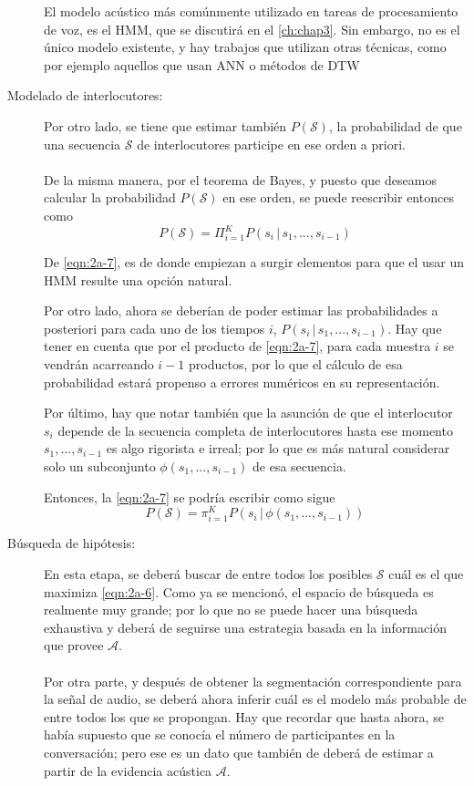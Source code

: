 \begin{description}
El modelo acústico más comúnmente utilizado en tareas de procesamiento de voz, es el \acf{HMM}, que se discutirá en el \autoref{ch:chap3}. Sin embargo, no es el único modelo existente, y hay trabajos que utilizan otras técnicas, como por ejemplo aquellos que usan \ac{ANN} \cite{Jothilakshmi2009} \cite{Gutzwiller2010}  o métodos de \ac{DTW} \cite{Huijbregts2011} 
 
\item[Modelado de interlocutores:]
Por otro lado, se tiene que estimar también $P(\mathcal{S})$, la probabilidad de que una secuencia $\mathcal{S}$ de interlocutores participe en ese orden a priori. 
\\~\\
De la misma manera, por el teorema de Bayes, y puesto que deseamos calcular la probabilidad $P(\mathcal{S})$ en ese orden, se puede reescribir entonces como
\begin{equation}
P(\mathcal{S}) = \Pi_{i=1}^K P(s_i \,|\, s_1, ..., s_{i-1})
\label{eqn:2a-7}
\end{equation}

De \eqref{eqn:2a-7}, es de donde empiezan a surgir elementos para que el usar un \ac{HMM} resulte una opción natural.

Por otro lado, ahora se deberían de poder estimar las probabilidades a posteriori para cada uno de los tiempos $i$, $P(s_i \,|\, s_1, ..., s_{i-1})$. Hay que tener en cuenta que por el producto de \eqref{eqn:2a-7}, para cada muestra $i$ se vendrán acarreando $i-1$ productos, por lo que el cálculo de esa probabilidad estará propenso a errores numéricos en su representación.

Por último, hay que notar también que la asunción de que el interlocutor $s_i$ depende de la secuencia completa de interlocutores hasta ese momento $s_1, ..., s_{i-1}$ es algo rigorista e irreal; por lo que es más natural considerar solo un subconjunto $\phi(s_1, ..., s_{i-1})$ de esa secuencia.

Entonces, la \eqref{eqn:2a-7} se podría escribir como sigue
\begin{equation}
P(\mathcal{S}) = \pi_{i=1}^K P(s_i \,|\, \phi(s_1, ..., s_{i-1}))
\label{eqn:2a-8}
\end{equation}

\item[Búsqueda de hipótesis:]
En esta etapa, se deberá buscar de entre todos los posibles $\mathcal{S}$ cuál es el que maximiza \eqref{eqn:2a-6}. Como ya se mencionó, el espacio de búsqueda es realmente muy grande; por lo que no se puede hacer una búsqueda exhaustiva y deberá de seguirse una estrategia basada en la información que provee $\mathcal{A}$.
\\~\\
Por otra parte, y después de obtener la segmentación correspondiente para la señal de audio, se deberá ahora inferir cuál es el modelo más probable de entre todos los que se propongan. Hay que recordar que hasta ahora, se había supuesto que se conocía el número de participantes en la conversación; pero ese es un dato que también de deberá de estimar a partir de la evidencia acústica $\mathcal{A}$.
\end{description}

